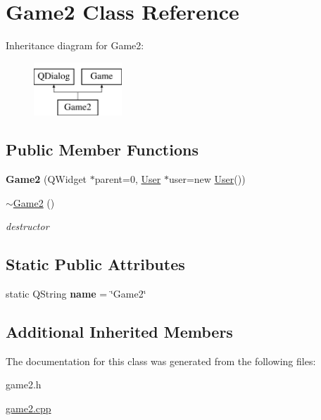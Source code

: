 \hypertarget{classGame2}{\section{Game2 Class Reference}
\label{classGame2}
}
Inheritance diagram for Game2\-:\begin{figure}[H]
\begin{center}
\leavevmode
\includegraphics[height=2.000000cm]{classGame2}
\end{center}
\end{figure}
\subsection*{Public Member Functions}
\begin{DoxyCompactItemize}
\item 
\hypertarget{classGame2_acf087c1caa149631a1a20be7d90c8577}{{\bfseries Game2} (Q\-Widget $\ast$parent=0, \hyperlink{classUser}{User} $\ast$user=new \hyperlink{classUser}{User}())}\label{classGame2_acf087c1caa149631a1a20be7d90c8577}

\item 
\hypertarget{classGame2_a7c8c6d11b9f40a3cf3cc5b87f9a85807}{\hyperlink{classGame2_a7c8c6d11b9f40a3cf3cc5b87f9a85807}{$\sim$\-Game2} ()}\label{classGame2_a7c8c6d11b9f40a3cf3cc5b87f9a85807}

\begin{DoxyCompactList}\small\item\em destructor \end{DoxyCompactList}\end{DoxyCompactItemize}
\subsection*{Static Public Attributes}
\begin{DoxyCompactItemize}
\item 
\hypertarget{classGame2_a86faa987733f5a4b264d3f964261ffe9}{static Q\-String {\bfseries name} = \char`\"{}Game2\char`\"{}}\label{classGame2_a86faa987733f5a4b264d3f964261ffe9}

\end{DoxyCompactItemize}
\subsection*{Additional Inherited Members}


The documentation for this class was generated from the following files\-:\begin{DoxyCompactItemize}
\item 
game2.\-h\item 
\hyperlink{game2_8cpp}{game2.\-cpp}\end{DoxyCompactItemize}
